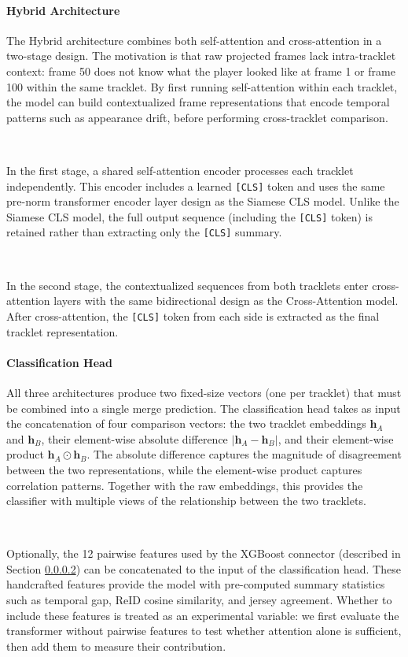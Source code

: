 \paragraph{Hybrid Architecture}\label{par:hybrid}
The Hybrid architecture combines both self-attention and cross-attention in a two-stage design. The motivation is that raw projected frames lack intra-tracklet context: frame 50 does not know what the player looked like at frame 1 or frame 100 within the same tracklet. By first running self-attention within each tracklet, the model can build contextualized frame representations that encode temporal patterns such as appearance drift, before performing cross-tracklet comparison.

\

In the first stage, a shared self-attention encoder processes each tracklet independently. This encoder includes a learned \texttt{[CLS]} token and uses the same pre-norm transformer encoder layer design as the Siamese CLS model. Unlike the Siamese CLS model, the full output sequence (including the \texttt{[CLS]} token) is retained rather than extracting only the \texttt{[CLS]} summary.

\

In the second stage, the contextualized sequences from both tracklets enter cross-attention layers with the same bidirectional design as the Cross-Attention model. After cross-attention, the \texttt{[CLS]} token from each side is extracted as the final tracklet representation.


\paragraph{Classification Head}
All three architectures produce two fixed-size vectors (one per tracklet) that must be combined into a single merge prediction. The classification head takes as input the concatenation of four comparison vectors: the two tracklet embeddings $\mathbf{h}_A$ and $\mathbf{h}_B$, their element-wise absolute difference $|\mathbf{h}_A - \mathbf{h}_B|$, and their element-wise product $\mathbf{h}_A \odot \mathbf{h}_B$. The absolute difference captures the magnitude of disagreement between the two representations, while the element-wise product captures correlation patterns. Together with the raw embeddings, this provides the classifier with multiple views of the relationship between the two tracklets.

\

Optionally, the 12 pairwise features used by the XGBoost connector (described in Section \ref{}) can be concatenated to the input of the classification head. These handcrafted features provide the model with pre-computed summary statistics such as temporal gap, ReID cosine similarity, and jersey agreement. Whether to include these features is treated as an experimental variable: we first evaluate the transformer without pairwise features to test whether attention alone is sufficient, then add them to measure their contribution.

